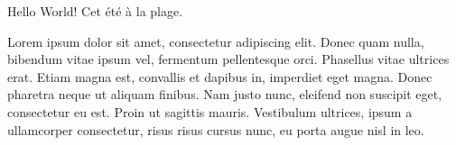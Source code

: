 \documentclass{book}
\begin{document}
Hello World! Cet été à la plage.

Lorem ipsum dolor sit amet, consectetur adipiscing elit. Donec quam
nulla, bibendum vitae ipsum vel, fermentum pellentesque orci.
Phasellus vitae ultrices erat. Etiam magna est, convallis et dapibus
in, imperdiet eget magna. Donec pharetra neque ut aliquam finibus. Nam
justo nunc, eleifend non suscipit eget, consectetur eu est. Proin ut
sagittis mauris. Vestibulum ultrices, ipsum a ullamcorper consectetur,
risus risus cursus nunc, eu porta augue nisl in leo.
\end{document}
